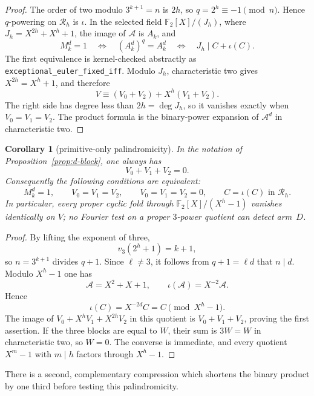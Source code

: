 \documentclass[11pt]{article}
\newtheorem{corollary}[theorem]{Corollary}
\theoremstyle{definition}
\theoremstyle{remark}
\begin{document}
\begin{proof}
The order of two modulo $3^{k+1}=n$ is $2h$, so
$q=2^h\equiv-1\pmod n$.  Hence $q$-powering on $\mathcal R_h$ is
$\iota$.  In the selected field
$\mathbb F_2[X]/(J_h)$, where $J_h=X^{2h}+X^h+1$, the image of
$\mathcal A$ is $A_k$, and
\[
 M_k^d=1
 \quad\Longleftrightarrow\quad
 (A_k^d)^q=A_k^d
 \quad\Longleftrightarrow\quad
 J_h\mid C+\iota(C).
\]
The first equivalence is kernel-checked abstractly as
\texttt{exceptional\_euler\_fixed\_iff}.  Modulo $J_h$, characteristic two
gives $X^{2h}=X^h+1$, and therefore
\[
 V\equiv(V_0+V_2)+X^h(V_1+V_2).
\]
The right side has degree less than $2h=\deg J_h$, so it vanishes exactly
when $V_0=V_1=V_2$.  The product formula is the binary-power expansion of
$\mathcal A^d$ in characteristic two.
\end{proof}

\begin{corollary}[primitive-only palindromicity]
\label{cor:d-palindromic}
In the notation of Proposition~\ref{prop:d-block}, one always has
\[
 V_0+V_1+V_2=0.
\]
Consequently the following conditions are equivalent:
\[
 M_k^d=1,
 \qquad V_0=V_1=V_2,
 \qquad V_0=V_1=V_2=0,
 \qquad C=\iota(C)\text{ in }\mathcal R_h.
\]
In particular, every proper cyclic fold through
$\mathbb F_2[X]/(X^h-1)$ vanishes identically on $V$; no Fourier test on a
proper $3$-power quotient can detect arm~$D$.
\end{corollary}

\begin{proof}
By lifting the exponent of three,
\[
 v_3(2^h+1)=k+1,
\]
so $n=3^{k+1}$ divides $q+1$.  Since $\ell\ne3$, it follows from
$q+1=\ell d$ that $n\mid d$.  Modulo $X^h-1$ one has
\[
 \mathcal A=X^2+X+1,
 \qquad \iota(\mathcal A)=X^{-2}\mathcal A.
\]
Hence
\[
 \iota(C)=X^{-2d}C=C
       \pmod {X^h-1}.
\]
The image of $V_0+X^hV_1+X^{2h}V_2$ in this quotient is
$V_0+V_1+V_2$, proving the first assertion.  If the three blocks are equal
to $W$, their sum is $3W=W$ in characteristic two, so $W=0$.  The converse
is immediate, and every quotient $X^m-1$ with $m\mid h$ factors through
$X^h-1$.
\end{proof}

There is a second, complementary compression which shortens the binary
product by one third before testing this palindromicity.
\end{document}
